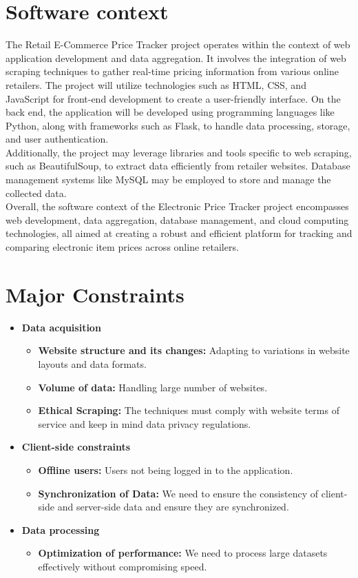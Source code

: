 \documentclass[a4paper,14pt,onecolumn]{report}
\begin{document}
	\section{Software context} 
	\begin{itemize}
		The Retail E-Commerce Price Tracker project operates within the context of web application development and data aggregation. It involves the integration of web scraping techniques to gather real-time pricing information from various online retailers. The project will utilize technologies such as HTML, CSS, and JavaScript for front-end development to create a user-friendly interface. On the back end, the application will be developed using programming languages like Python, along with frameworks such as Flask, to handle data processing, storage, and user authentication.
		\\
		Additionally, the project may leverage libraries and tools specific to web scraping, such as BeautifulSoup, to extract data efficiently from retailer websites. Database management systems like MySQL may be employed to store and manage the collected data.
		\\
		Overall, the software context of the Electronic Price Tracker project encompasses web development, data aggregation, database management, and cloud computing technologies, all aimed at creating a robust and efficient platform for tracking and comparing electronic item prices across online retailers.
	\end{itemize}
	\section{Major Constraints}
	\begin{itemize}
		\item \textbf{Data acquisition}
		\begin{itemize}
			\item \textbf{Website structure and its changes:} Adapting to variations in website layouts and data formats.
			\item \textbf{Volume of data:} Handling large number of websites.
			\item \textbf{Ethical Scraping:} The techniques must comply with website terms of service and keep in mind data privacy regulations.
		\end{itemize}
		\item \textbf{Client-side constraints}
		\begin{itemize}
			\item \textbf{Offline users:} Users not being logged in to the application.
			\item \textbf{Synchronization of Data:} We need to ensure the consistency of client-side and server-side data and ensure they are synchronized.
		\end{itemize}
		\item \textbf{Data processing}
		\begin{itemize}
			\item \textbf{Optimization of performance:} We need to process large datasets effectively without compromising speed.
		\end{itemize}
		
	\end{itemize}
	
\end{document}
